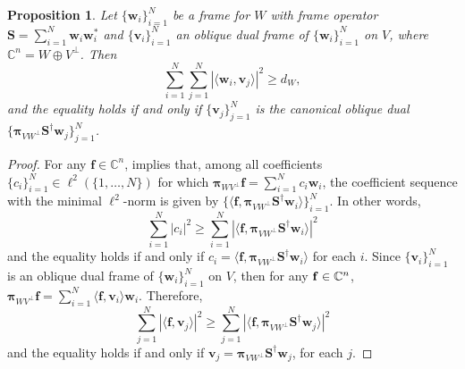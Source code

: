 \documentclass{amsart}
\numberwithin{equation}{section}
\newcommand{\bpi}{{\boldsymbol{\pi}}}
\theoremstyle{plain}
\newtheorem{proposition}[theorem]{Proposition}
\theoremstyle{remark}
\theoremstyle{definition}
\begin{document}
\begin{proposition}\label{lemma:oblique_dual_potential}
    Let $\{\mathbf{w}_i\}_{i=1}^N$ be a frame for $W$ with frame operator $ \mathbf{S} = \sum_{i=1}^N \mathbf{w}_i\mathbf{w}_i^*$ and $\{\mathbf{v}_i\}_{i=1}^N$ an oblique dual frame of $\{\mathbf{w}_i\}_{i=1}^N$ on $V$, where $\mathbb{C}^n = W \oplus V^\perp$. Then 
    \begin{equation*}
         \sum_{i=1}^N \sum_{j=1}^N |\langle \mathbf{w}_i, \mathbf{v}_j \rangle |^2 \geq d_W,
    \end{equation*}
and the equality holds if and only if $\{\mathbf{v}_j\}_{j=1}^N$ is the canonical oblique dual $\{\bpi_{VW^\perp} \mathbf{S}^{\dagger} \mathbf{w}_j\}_{j=1}^N$. 
\end{proposition}
\begin{proof}
For any $\mathbf{f} \in \mathbb{C}^n$, \cite[Proposition 4]{eldar2003sampling} implies that, among all coefficients $\{c_i\}_{i=1}^N \in \ell^2(\{1, \dots, N\})$ for which $\bpi_{WV^\perp} \mathbf{f} = \sum\limits_{i=1}^N c_i \mathbf{w}_i$,
the coefficient sequence with the minimal $\ell^2$-norm is given by $\{\langle \mathbf{f}, \bpi_{VW^\perp} \mathbf{S}^{\dagger} \mathbf{w}_i \rangle\}_{i=1}^N$. In other words, 
    \begin{equation*}
        \sum_{i=1}^N |c_i|^2 \geq \sum_{i=1}^N |\langle \mathbf{f}, \bpi_{VW^\perp} \mathbf{S}^{\dagger} \mathbf{w}_i \rangle|^2
    \end{equation*}
and the equality holds if and only if $c_i = \langle \mathbf{f}, \bpi_{VW^\perp} \mathbf{S}^{\dagger} \mathbf{w}_i \rangle$ for each $i$. 
Since $\{\mathbf{v}_i\}_{i=1}^N$ is an oblique dual frame of $\{\mathbf{w}_i\}_{i=1}^N$ on $V$, then for any ${\bf f} \in \mathbb{C}^n$, 
$\bpi_{WV^\perp} \mathbf{f} = \sum\limits_{i=1}^N \langle \mathbf{f}, \mathbf{v}_i \rangle \mathbf{w}_i$. Therefore, 
\begin{equation}\label{eqn:minObliqueDual}
    \sum_{j=1}^N |\langle \mathbf{f}, \mathbf{v}_j \rangle|^2 \geq \sum_{j=1}^N |\langle \mathbf{f}, \bpi_{VW^\perp} \mathbf{S}^{\dagger} \mathbf{w}_j \rangle|^2
\end{equation}
and the equality holds if and only if $\mathbf{v}_j = \bpi_{VW^\perp} \mathbf{S}^{\dagger} \mathbf{w}_j$, for each $j$. 



\end{proof}
\end{document}
